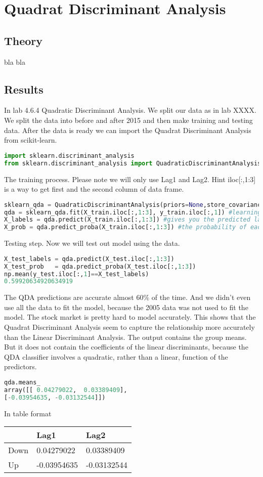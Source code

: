 \section{Quadrat Discriminant Analysis}

\subsection{Theory}
bla bla

\subsection{Results}
In lab 4.6.4 Quadratic Discriminant Analysis. We split our data as in lab XXXX. We split the data into before and after 2015 and then make training and testing data. After the data is ready we can import the Quadrat Discriminant Analysis from scikit-learn.
\begin{lstlisting}[language=Python]
import sklearn.discriminant_analysis
from sklearn.discriminant_analysis import QuadraticDiscriminantAnalysis
\end{lstlisting}
The training process. Please note we will only use Lag1 and Lag2. Hint iloc[:,1:3] is a way to get first and the second column of data frame.
\begin{lstlisting}[language=Python]
sklearn_qda = QuadraticDiscriminantAnalysis(priors=None,store_covariance=True) #creating a QDA object
qda = sklearn_qda.fit(X_train.iloc[:,1:3], y_train.iloc[:,1]) #learning the projection matrix
X_labels = qda.predict(X_train.iloc[:,1:3]) #gives you the predicted label for each sample
X_prob = qda.predict_proba(X_train.iloc[:,1:3]) #the probability of each sample to belong to each class
\end{lstlisting}
Testing step. Now we will test out model using the data.
\begin{lstlisting}[language=Python]
X_test_labels = qda.predict(X_test.iloc[:,1:3])
X_test_prob   = qda.predict_proba(X_test.iloc[:,1:3])
np.mean(y_test.iloc[:,1]==X_test_labels)
0.59920634920634919
\end{lstlisting}
The QDA predictions are accurate almost 60\% of the time. And we didn't even use all the data to fit the model, because the 2005 data was not used to fit the model. The stock market is pretty hard to model accurately.
This shows that the Quadrat Discriminant Analysis seem to capture the relationship more accurately than the Linear Discriminant Analysis. The output contains the group means. But it does not contain the coefficients of the linear discriminants, because the QDA classifier involves a quadratic, rather than a linear, function of the predictors.

\begin{lstlisting}[language=Python]
qda.means_
array([[ 0.04279022,  0.03389409],
[-0.03954635, -0.03132544]])
\end{lstlisting}
In table format
\begin{longtable}[]{@{}lll@{}}
	\toprule
	& Lag1 & Lag2\tabularnewline
	\midrule
	\endhead
	Down & 0.04279022 & 0.03389409\tabularnewline
	Up & -0.03954635 & -0.03132544\tabularnewline
	\bottomrule
\end{longtable}